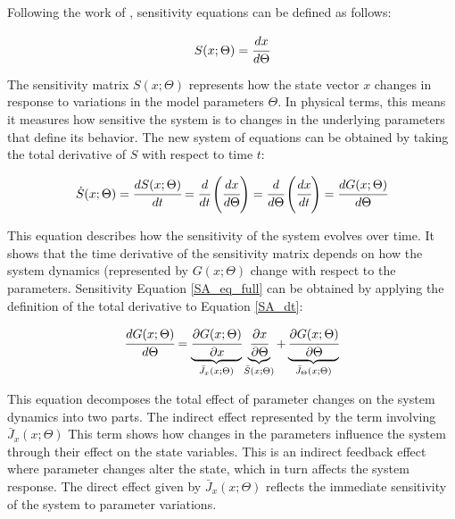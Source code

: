 \documentclass[a4paper,fleqn]{cas-dc}
\begin{document}
	Following the work of \citet{Maly1996}, sensitivity equations can be defined as follows:
	
	{\footnotesize
		\begin{equation}
			\label{SA_def}
			S(x;\Theta) = \cfrac{dx}{d\Theta}
	\end{equation} }
	
	{\color{blue}The sensitivity matrix $S(x;\Theta)$ represents how the state vector $x$ changes in response to variations in the model parameters $\Theta$. In physical terms, this means it measures how sensitive the system is to changes in the underlying parameters that define its behavior.} The new system of equations can be obtained by taking the total derivative of $S$ with respect to time $t$:
	
	{\footnotesize
		\begin{equation} \label{SA_dt} 
			{\dot{S}}(x;\Theta)  = \cfrac{dS(x;\Theta)}{d t} = \cfrac{d}{d t} \left( \cfrac{dx}{d\Theta} \right) = \cfrac{d }{d\Theta} \left( \cfrac{dx}{d t} \right) = \cfrac{d G(x;\Theta)}{d\Theta} 
	\end{equation} }
	
	{\color{blue}This equation describes how the sensitivity of the system evolves over time. It shows that the time derivative of the sensitivity matrix depends on how the system dynamics (represented by $G(x; \Theta)$ change with respect to the parameters.} Sensitivity Equation \ref{SA_eq_full} can be obtained by applying the definition of the total derivative to Equation \ref{SA_dt}:
	
	{\footnotesize
		\begin{equation} \label{SA_eq_full}
			\cfrac{d G(x;\Theta)}{d \Theta} = \underbrace{ \cfrac{\partial G(x;\Theta)}{\partial x} }_{{\bar{J}_x}(x;\Theta)} \underbrace{\cfrac{\partial x}{\partial \Theta} }_{\bar{S}(x;\Theta)} + \underbrace{ \cfrac{\partial G(x;\Theta)}{\partial \Theta} }_{{\bar{J}_\Theta}(x;\Theta)}
	\end{equation} }

	{\color{blue}This equation decomposes the total effect of parameter changes on the system dynamics into two parts. The indirect effect represented by the term involving $\bar{J}_x (x; \Theta)$ This term shows how changes in the parameters influence the system through their effect on the state variables. This is an indirect feedback effect where parameter changes alter the state, which in turn affects the system response. The direct effect given by $\bar{J}_x (x; \Theta)$ reflects the immediate sensitivity of the system to parameter variations.}
	
\end{document}
